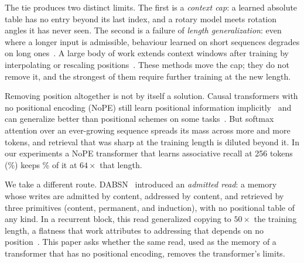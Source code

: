 \documentclass[11pt]{article}
\begin{document}
The tie produces two distinct limits. The first is a \emph{context cap}: a learned
absolute table has no entry beyond its last index, and a rotary model meets
rotation angles it has never seen. The second is a failure of \emph{length
generalization}: even where a longer input is admissible, behaviour learned on
short sequences degrades on long ones~\citep{press2022train,kazemnejad2023impact}.
A large body of work extends context windows after training by interpolating or
rescaling positions~\citep{chen2023extending,peng2024yarn}. These methods move the
cap; they do not remove it, and the strongest of them require further training at
the new length.

Removing position altogether is not by itself a solution. Causal transformers with
no positional encoding (NoPE) still learn positional information
implicitly~\citep{haviv2022transformer} and can generalize better than positional
schemes on some tasks~\citep{kazemnejad2023impact}. But softmax attention over an
ever-growing sequence spreads its mass across more and more tokens, and retrieval
that was sharp at the training length is diluted beyond it. In our experiments a
NoPE transformer that learns associative recall at 256 tokens (\nopeScaleVal\%)
keeps \nopeScaleDistSixtyFour\% of it at $64\times$ that length.

We take a different route. DABSN~\citep{rosdahl2026dabsn} introduced an
\emph{admitted read}: a memory whose writes are admitted by content, addressed by
content, and retrieved by three primitives (content, permanent, and induction),
with no positional table of any kind. In a recurrent block, this read generalized
copying to $50\times$ the training length, a flatness that work attributes to
addressing that depends on no position~\citep{rosdahl2026dabsn}. This
paper asks whether the same read, used as the memory of a transformer that has no
positional encoding, removes the transformer's limits.
\end{document}
